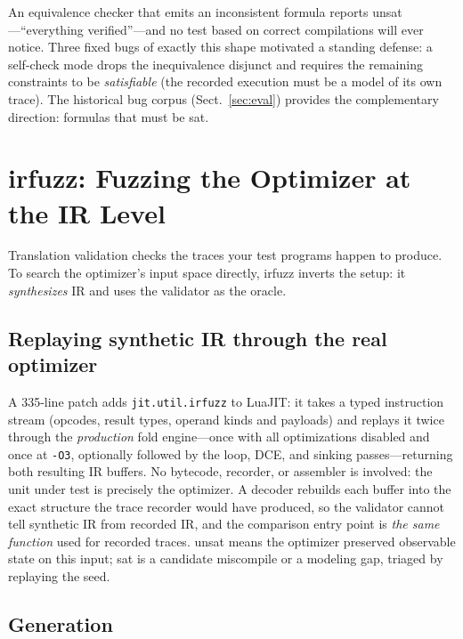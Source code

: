 \documentclass[runningheads]{llncs}
\newcommand{\irfuzz}{\textsf{irfuzz}}
\begin{document}
An equivalence checker that emits an inconsistent formula reports
\textsf{unsat}---``everything verified''---and no test based on correct
compilations will ever notice. Three fixed bugs of exactly this shape
motivated a standing defense: a self-check mode drops the inequivalence
disjunct and requires the remaining constraints to be \emph{satisfiable}
(the recorded execution must be a model of its own trace). The historical
bug corpus (Sect.~\ref{sec:eval}) provides the complementary direction:
formulas that must be \textsf{sat}.
\fi %

\section{\irfuzz: Fuzzing the Optimizer at the IR Level}\label{sec:irfuzz}

Translation validation checks the traces your test programs happen to
produce. To search the optimizer's input space directly, \irfuzz{} inverts
the setup: it \emph{synthesizes} IR and uses the validator as the oracle.

\subsection{Replaying synthetic IR through the real optimizer}

A 335-line patch adds \texttt{jit.util.irfuzz} to LuaJIT: it takes a typed
instruction stream (opcodes, result types, operand kinds and payloads) and
replays it twice through the \emph{production} fold engine---once with all
optimizations disabled and once at \texttt{-O3}, optionally followed by the
loop, DCE, and sinking passes---returning both resulting IR buffers. No
bytecode, recorder, or assembler is involved: the unit under test is
precisely the optimizer. A decoder rebuilds each buffer into the exact
structure the trace recorder would have produced, so the validator cannot
tell synthetic IR from recorded IR, and the comparison entry point is
\emph{the same function} used for recorded traces. \textsf{unsat} means the
optimizer preserved observable state on this input; \textsf{sat} is a
candidate miscompile or a modeling gap, triaged by replaying the seed.

\subsection{Generation}
\end{document}
